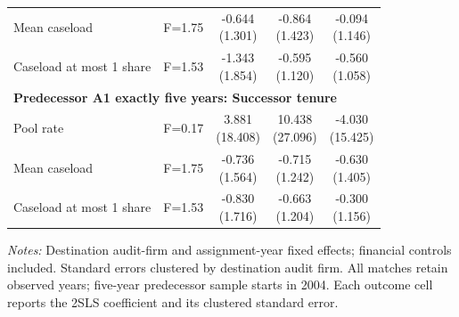 \begin{table}[htbp]
\begin{threeparttable}
\begin{tabular}{p{}cccc}
Mean caseload & F=1.75 & \shortstack{-0.644\\(1.301)} & \shortstack{-0.864\\(1.423)} & \shortstack{-0.094\\(1.146)} \\
Caseload at most 1 share & F=1.53 & \shortstack{-1.343\\(1.854)} & \shortstack{-0.595\\(1.120)} & \shortstack{-0.560\\(1.058)} \\
\multicolumn{5}{l}{\textbf{Predecessor A1 exactly five years: Successor tenure}} \\
Pool rate & F=0.17 & \shortstack{3.881\\(18.408)} & \shortstack{10.438\\(27.096)} & \shortstack{-4.030\\(15.425)} \\
Mean caseload & F=1.75 & \shortstack{-0.736\\(1.564)} & \shortstack{-0.715\\(1.242)} & \shortstack{-0.630\\(1.405)} \\
Caseload at most 1 share & F=1.53 & \shortstack{-0.830\\(1.716)} & \shortstack{-0.663\\(1.204)} & \shortstack{-0.300\\(1.156)} \\
\bottomrule
\end{tabular}
\begin{tablenotes}\footnotesize
\item \raggedright \textit{Notes:} Destination audit-firm and assignment-year fixed effects; financial controls included. Standard errors clustered by destination audit firm. All matches retain observed years; five-year predecessor sample starts in 2004. Each outcome cell reports the 2SLS coefficient and its clustered standard error.
\end{tablenotes}
\end{threeparttable}
\end{table}
